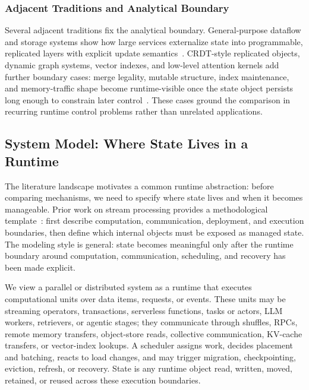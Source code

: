\documentclass[manuscript]{acmart}
\begin{document}
\subsubsection{Adjacent Traditions and Analytical Boundary}

Several adjacent traditions fix the analytical boundary. General-purpose dataflow and storage systems show how large services externalize state into programmable, replicated layers with explicit update semantics~\cite{isard2007dryad,chambers2010flumejava,murray2011ciel,chang2008bigtable,decandia2007dynamo,lakshman2010cassandra,baker2011megastore,peng2010percolator}. CRDT-style replicated objects, dynamic graph systems, vector indexes, and low-level attention kernels add further boundary cases: merge legality, mutable structure, index maintenance, and memory-traffic shape become runtime-visible once the state object persists long enough to constrain later control~\cite{shapiro2011crdt,gao2026grace,karpukhin2020dpr,khattab2020colbert,jegou2011pq,malkov2020hnsw,dao2024flashattention2}. These cases ground the comparison in recurring runtime control problems rather than unrelated applications.


\subsection{System Model: Where State Lives in a Runtime}

The literature landscape motivates a common runtime abstraction: before comparing mechanisms, we need to specify where state lives and when it becomes manageable. Prior work on stream processing provides a methodological template~\cite{fernandez2010seep,fernandez2013osm,mao2025spacker,carbone2015flink}: first describe computation, communication, deployment, and execution boundaries, then define which internal objects must be exposed as managed state. The modeling style is general: state becomes meaningful only after the runtime boundary around computation, communication, scheduling, and recovery has been made explicit.

We view a parallel or distributed system as a runtime that executes computational units over data items, requests, or events. These units may be streaming operators, transactions, serverless functions, tasks or actors, LLM workers, retrievers, or agentic stages; they communicate through shuffles, RPCs, remote memory transfers, object-store reads, collective communication, KV-cache transfers, or vector-index lookups. A scheduler assigns work, decides placement and batching, reacts to load changes, and may trigger migration, checkpointing, eviction, refresh, or recovery. State is any runtime object read, written, moved, retained, or reused across these execution boundaries.
\end{document}
